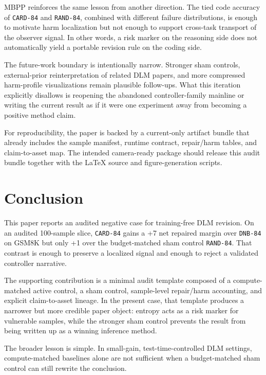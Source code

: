 \documentclass{article}
\begin{document}
MBPP reinforces the same lesson from another direction. The tied code accuracy of \texttt{CARD-84} and \texttt{RAND-84}, combined with different failure distributions, is enough to motivate harm localization but not enough to support cross-task transport of the observer signal. In other words, a risk marker on the reasoning side does not automatically yield a portable revision rule on the coding side.

The future-work boundary is intentionally narrow. Stronger sham controls, external-prior reinterpretation of related DLM papers, and more compressed harm-profile visualizations remain plausible follow-ups. What this iteration explicitly disallows is reopening the abandoned controller-family mainline or writing the current result as if it were one experiment away from becoming a positive method claim.

For reproducibility, the paper is backed by a current-only artifact bundle that already includes the sample manifest, runtime contract, repair/harm tables, and claim-to-asset map. The intended camera-ready package should release this audit bundle together with the LaTeX source and figure-generation scripts.

\section{Conclusion}
\label{sec:conclusion}

This paper reports an audited negative case for training-free DLM revision. On an audited 100-sample slice, \texttt{CARD-84} gains a +7 net repaired margin over \texttt{DNB-84} on GSM8K but only +1 over the budget-matched sham control \texttt{RAND-84}. That contrast is enough to preserve a localized signal and enough to reject a validated controller narrative.

The supporting contribution is a minimal audit template composed of a compute-matched active control, a sham control, sample-level repair/harm accounting, and explicit claim-to-asset lineage. In the present case, that template produces a narrower but more credible paper object: entropy acts as a risk marker for vulnerable samples, while the stronger sham control prevents the result from being written up as a winning inference method.

The broader lesson is simple. In small-gain, test-time-controlled DLM settings, compute-matched baselines alone are not sufficient when a budget-matched sham control can still rewrite the conclusion.
\end{document}

